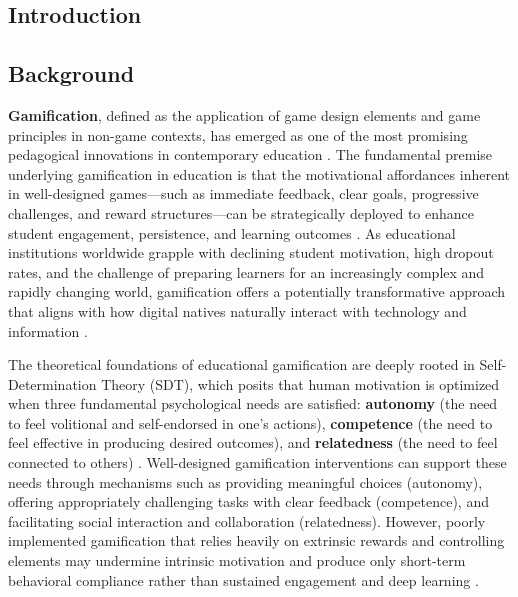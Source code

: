 \documentclass[12pt,a4paper]{article}
\begin{document}
\begin{justify}


\section{Introduction}

\subsection{Background}

\textbf{Gamification}, defined as the application of game design elements and game principles in non-game contexts, has emerged as one of the most promising pedagogical innovations in contemporary education \parencite{ryan2025,wu2024}. The fundamental premise underlying gamification in education is that the motivational affordances inherent in well-designed games—such as immediate feedback, clear goals, progressive challenges, and reward structures—can be strategically deployed to enhance student engagement, persistence, and learning outcomes \parencite{rodriguez2025}. As educational institutions worldwide grapple with declining student motivation, high dropout rates, and the challenge of preparing learners for an increasingly complex and rapidly changing world, gamification offers a potentially transformative approach that aligns with how digital natives naturally interact with technology and information \parencite{wu2024}.

The theoretical foundations of educational gamification are deeply rooted in Self-Determination Theory (SDT), which posits that human motivation is optimized when three fundamental psychological needs are satisfied: \textbf{autonomy} (the need to feel volitional and self-endorsed in one's actions), \textbf{competence} (the need to feel effective in producing desired outcomes), and \textbf{relatedness} (the need to feel connected to others) \parencite{ryan2025}. Well-designed gamification interventions can support these needs through mechanisms such as providing meaningful choices (autonomy), offering appropriately challenging tasks with clear feedback (competence), and facilitating social interaction and collaboration (relatedness). However, poorly implemented gamification that relies heavily on extrinsic rewards and controlling elements may undermine intrinsic motivation and produce only short-term behavioral compliance rather than sustained engagement and deep learning \parencite{ryan2025}.


\end{justify}
\end{document}
